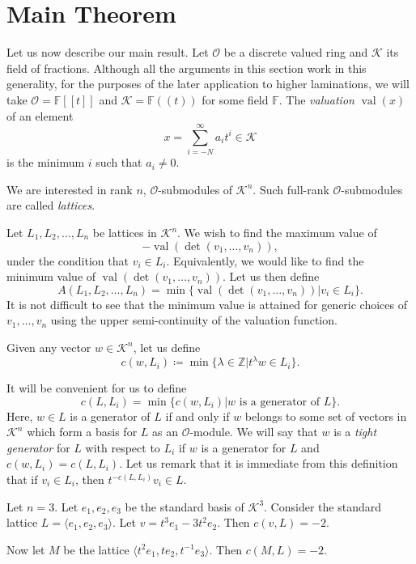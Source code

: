 \documentclass[ALCO,ThmDefs,Unicode,epreuves]{cedram}
\newcommand{\F}{\mathbb{F}}
\newcommand{\Z}{\mathbb{Z}}
\newcommand{\cO}{\mathcal{O}}
\newcommand{\cK}{\mathcal{K}}
\newcommand{\val}{\operatorname{val}}
\begin{document}
\section{Main Theorem}\label{sect4}

Let us now describe our main result. Let $\cO$ be a discrete valued ring and $\cK$ its field of fractions. Although all the arguments in this section work in this generality, for the purposes of the later application to higher laminations, we will take $\cO=\F[[t]]$ and $\cK=\F((t))$ for some field $\F$. The \emph{valuation} $\val(x)$ of an element 
\[
x = \sum_{i=-N}^{\infty} a_i t^i \in \cK
\]
 is the minimum $i$ such that $a_i \neq 0$. 

We are interested in rank $n$, $\cO$-submodules of $\cK^n$. Such full-rank $\cO$-submodules are called {\it lattices}.

Let $L_1, L_2, \dots, L_n$ be lattices in $\cK^n$. We wish to find the maximum value of
\[
-\val(\det(v_1, \dots, v_n)),
\]
under the condition that $v_i \in L_i$. Equivalently, we would like to find the minimum value of $\val(\det(v_1, \dots, v_n)).$ Let us then define 
\[
A(L_1, L_2, \dots, L_n) = \min \{\val(\det(v_1, \dots, v_n)) | v_i \in L_i\}.
\]
It is not difficult to see that the minimum value is attained for generic choices of $v_1, \dots, v_n$ using the upper semi-continuity of the valuation function.

Given any vector $w \in \cK^n$, let us define 
\[
c(w,L_i) \coloneqq  \min\{\lambda \in \Z | t^{\lambda}w \in L_i \}.
\]

It will be convenient for us to define
\[
c(L,L_i) = \min \{ c(w,L_i) | w \text{ is a generator of } L \}.
\]
Here, $w \in L$ is a generator of $L$ if and only if $w$ belongs to some set of vectors in $\cK^n$ which form a basis for $L$ as an $\cO$-module. We will say that $w$ is a \emph{tight generator} for $L$ with respect to $L_i$ if $w$ is a generator for $L$ and $c(w,L_i)=c(L,L_i)$. Let us remark that it is immediate from this definition that if $v_i \in L_i$, then $t^{-c(L,L_i)}v_i \in L$.

\begin{example} Let $n=3$. Let $e_1, e_2, e_3$ be the standard basis of $\cK^3$. Consider the standard lattice $L= \langle e_1, e_2, e_3\rangle .$ Let $v=t^3e_1 -3t^2 e_2$. Then $c(v, L)= -2$.

Now let $M$ be the lattice $\langle t^2e_1, te_2, t^{-1}e_3\rangle $. Then $c(M,L) = -2$.

\end{example}
\end{document}
